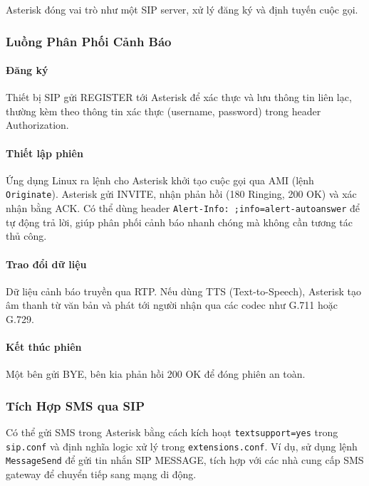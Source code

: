 Asterisk đóng vai trò như một SIP server, xử lý đăng ký và định tuyến cuộc gọi.

\subsubsection{Luồng Phân Phối Cảnh Báo}
\label{subsubsec:sip_alert_flows}

\paragraph{Đăng ký}
Thiết bị SIP gửi REGISTER tới Asterisk để xác thực và lưu thông tin liên lạc, thường kèm theo thông tin xác thực (username, password) trong header Authorization.

\paragraph{Thiết lập phiên}
Ứng dụng Linux ra lệnh cho Asterisk khởi tạo cuộc gọi qua AMI (lệnh \texttt{Originate}). Asterisk gửi INVITE, nhận phản hồi (180 Ringing, 200 OK) và xác nhận bằng ACK. Có thể dùng header \texttt{Alert-Info: ;info=alert-autoanswer} để tự động trả lời, giúp phân phối cảnh báo nhanh chóng mà không cần tương tác thủ công.

\paragraph{Trao đổi dữ liệu}
Dữ liệu cảnh báo truyền qua RTP. Nếu dùng TTS (Text-to-Speech), Asterisk tạo âm thanh từ văn bản và phát tới người nhận qua các codec như G.711 hoặc G.729.

\paragraph{Kết thúc phiên}
Một bên gửi BYE, bên kia phản hồi 200 OK để đóng phiên an toàn.

\subsubsection{Tích Hợp SMS qua SIP}
\label{subsubsec:sip_sms}

Có thể gửi SMS trong Asterisk bằng cách kích hoạt \texttt{textsupport=yes} trong \texttt{sip.conf} và định nghĩa logic xử lý trong \texttt{extensions.conf}. Ví dụ, sử dụng lệnh \texttt{MessageSend} để gửi tin nhắn SIP MESSAGE, tích hợp với các nhà cung cấp SMS gateway để chuyển tiếp sang mạng di động.


